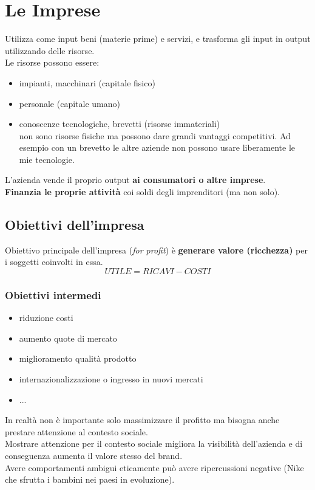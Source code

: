 \documentclass[../main.tex]{subfiles}
\begin{document}
\section{Le Imprese}
	
Utilizza come input beni (materie prime) e servizi, e trasforma gli input in output utilizzando delle risorse.\\
Le risorse possono essere:
    
    \begin{itemize}
        \item impianti, macchinari (capitale fisico)
        \item personale (capitale umano)
        \item conoscenze tecnologiche, brevetti (risorse immateriali)\\
            non sono risorse fisiche ma possono dare grandi vantaggi competitivi. Ad esempio con un brevetto le altre aziende non possono usare liberamente le mie tecnologie.
    \end{itemize}

L'azienda vende il proprio output \textbf{ai consumatori o altre imprese}.\\
\textbf{Finanzia le proprie attività} coi soldi degli imprenditori (ma non solo).


\subsection{Obiettivi dell'impresa}

Obiettivo principale dell'impresa (\emph{for profit}) è \textbf{generare valore (ricchezza)} per i soggetti coinvolti in essa.
$$ UTILE = RICAVI - COSTI $$

\subsubsection{Obiettivi intermedi}

    \begin{itemize}
        \item riduzione costi
        \item aumento quote di mercato
        \item miglioramento qualità prodotto
        \item internazionalizzazione o ingresso in nuovi mercati
        \item ...
    \end{itemize}

In realtà non è importante solo massimizzare il profitto ma bisogna anche prestare attenzione al contesto sociale.\\
Mostrare attenzione per il contesto sociale migliora la visibilità dell'azienda e di conseguenza aumenta il valore stesso del brand.\\
Avere comportamenti ambigui eticamente può avere ripercussioni negative (Nike che sfrutta i bambini nei paesi in evoluzione).
\end{document}
